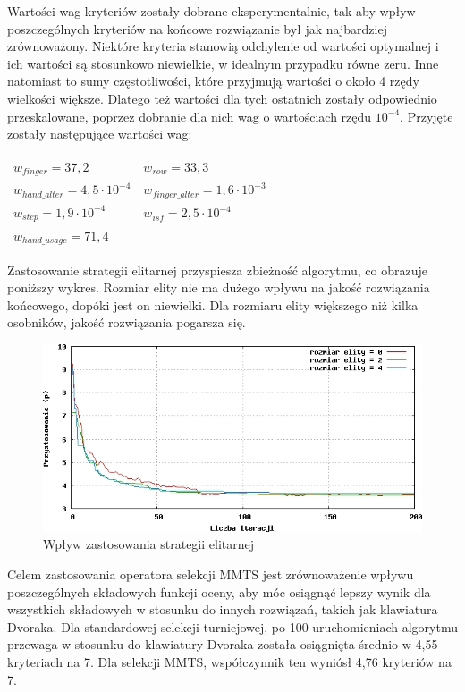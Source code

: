 \documentclass{xmgr}
\begin{document}
Wartości wag kryteriów zostały dobrane eksperymentalnie, tak aby wpływ poszczególnych kryteriów na końcowe rozwiązanie był jak najbardziej zrównoważony. Niektóre kryteria stanowią odchylenie od wartości optymalnej i ich wartości są stosunkowo niewielkie, w idealnym przypadku równe zeru. Inne natomiast to sumy częstotliwości, które przyjmują wartości o około 4 rzędy wielkości większe. Dlatego też wartości dla tych ostatnich zostały odpowiednio przeskalowane, poprzez dobranie dla nich wag o wartościach rzędu $10^{-4}$. Przyjęte zostały następujące wartości wag:
\newline
\begin{tabular}{ l l }
  \indent $ w_{finger} = 37,2 $ & \indent $ w_{row} = 33,3 $ \\
  \indent $ w_{hand\_alter} = 4,5 \cdot 10^{-4} $ & \indent $ w_{finger\_alter} = 1,6 \cdot 10^{-3} $ \\
  \indent $ w_{step} = 1,9 \cdot 10^{-4} $ & \indent $ w_{isf} = 2,5 \cdot 10^{-4} $ \\
  \indent $ w_{hand\_usage} = 71,4 $ & \\
\end{tabular}\newline

Zastosowanie strategii elitarnej przyspiesza zbieżność algorytmu, co obrazuje poniższy wykres. Rozmiar elity nie ma dużego wpływu na jakość rozwiązania końcowego, dopóki jest on niewielki. Dla rozmiaru elity większego niż kilka osobników, jakość rozwiązania pogarsza się.
\begin{figure}[!tbh]
\centering
\includegraphics[width=.8\hsize]{fig/elite}
\caption{Wpływ zastosowania strategii elitarnej}
\end{figure}

Celem zastosowania operatora selekcji MMTS jest zrównoważenie wpływu poszczególnych składowych funkcji oceny, aby móc osiągnąć lepszy wynik dla wszystkich składowych w stosunku do innych rozwiązań, takich jak klawiatura Dvoraka. Dla standardowej selekcji turniejowej, po 100 uruchomieniach algorytmu przewaga w stosunku do klawiatury Dvoraka została osiągnięta średnio w 4,55 kryteriach na 7. Dla selekcji MMTS, współczynnik ten wyniósł 4,76 kryteriów na 7.
\end{document}
